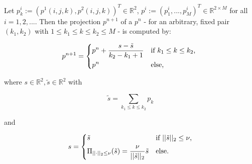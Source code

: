             \begin{algorithm}\label{alg:softshrinkage}
                Let $p^{i}_{k} := (p^{1}(i, j, k), p^{2}(i, j, k))^{T} \in \mathbb{R}^{2}$, $p^{i} := (p^{i}_{1}, ..., p^{i}_{M})^{T} \in \mathbb{R}^{2 \times M}$ for all $i = 1, 2, ...$. Then the projection $p^{n+1}$ of a $p^{n}$ - for an arbitrary, fixed pair $(k_{1}, k_{2})$ with $1 \le k_{1} \le k \le k_{2} \le M$ - is computed by:

                    \[
                        p^{n+1} =
                            \begin{dcases*}
                                p^{n} + \frac{s - \tilde{s}}{k_{2} - k_{1} + 1} & \textnormal{if $k_{1} \le k \le k_{2}$}, \\
                                p^{n} & \textnormal{else},
                            \end{dcases*}
                    \]

                where $s \in \mathbb{R}^{2}, \tilde{s} \in \mathbb{R}^{2}$ with

                    $$\tilde{s} = \sum_{k_{1} \le k \le k_{2}} p_{k}$$

                and

                    \[
                        s =
                            \begin{dcases*}
                                \tilde{s} & \textnormal{if $||\tilde{s}||_{2} \le \nu$},\\
                                \Pi_{||\cdot||_{2} \le \nu}(\tilde{s}) = \frac{\nu}{||\tilde{s}||_{2}} \tilde{s} & \textnormal{else}.
                            \end{dcases*}
                    \]

            \end{algorithm}

